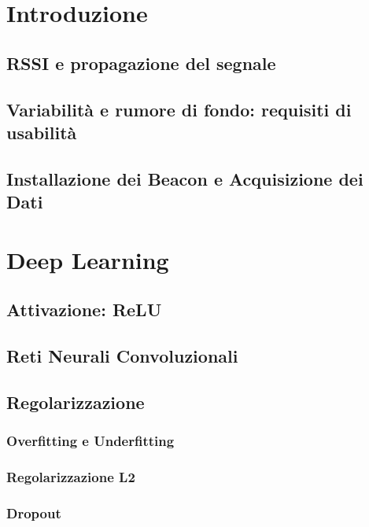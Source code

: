 \documentclass[12pt]{report}
\begin{document}
\begin{abstract}
  
\end{abstract}

\tableofcontents

\chapter{Introduzione}

\section{RSSI e propagazione del segnale}
\section{Variabilità e rumore di fondo: requisiti di usabilità}
\section{Installazione dei Beacon e Acquisizione dei Dati}

\chapter{Deep Learning}


\section{Attivazione: ReLU}
\section{Reti Neurali Convoluzionali}
\section{Regolarizzazione}
\subsection{Overfitting e Underfitting}
\subsection{Regolarizzazione L2}
\subsection{Dropout}
\end{document}
